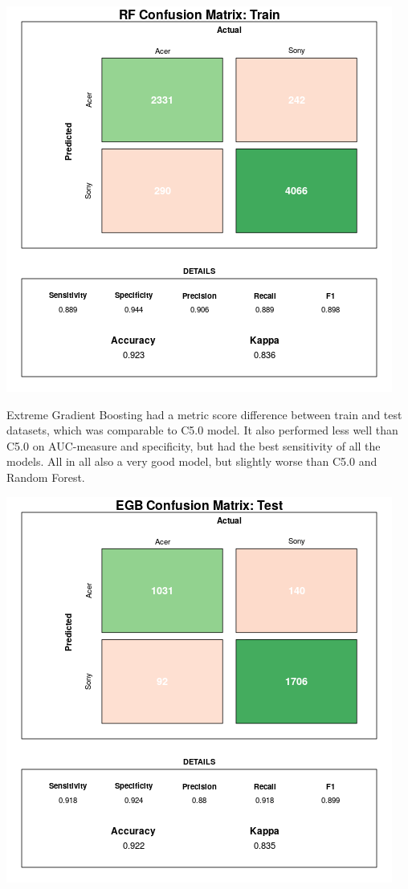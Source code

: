 \documentclass[12pt,a4paper,leqno]{report}
\theoremstyle{plain}
\theoremstyle{definition}
\theoremstyle{remark}
\begin{document}
\bigskip
{
    \centering
    \includegraphics[width=\textwidth,height=\textheight,keepaspectratio]{cm_rf_train.png}
    \par
}
\bigskip

Extreme Gradient Boosting had a metric score difference between train and test datasets, which
was comparable to C5.0 model. It also performed less well than C5.0 on AUC-measure and specificity,
but had the best sensitivity of all the models. All in all also a very good model, but slightly
worse than C5.0 and Random Forest.

\bigskip
{
    \centering
    \includegraphics[width=\textwidth,height=\textheight,keepaspectratio]{cm_egb.png}
    \par
}
\bigskip
\end{document}
